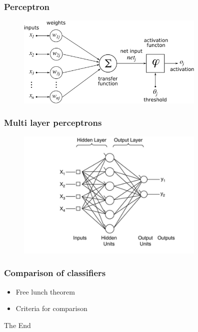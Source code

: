 \documentclass{beamer}
\begin{document}
\begin{frame} %
\frametitle{Perceptron}
\begin{figure}
	\centering
    \includegraphics[width=90mm,scale=1]{./img/perceptron.png}
\end{figure}

\end{frame}
\begin{frame}
\frametitle{Multi layer perceptrons}
\begin{figure}
	\centering
    \includegraphics[width=90mm,scale=1]{./img/MLP.jpg}
\end{figure}
\end{frame}



\begin{frame}
\frametitle{Comparison of classifiers}
\begin{itemize}
	\item Free lunch theorem
	\item Criteria for comparison %
	 
\end{itemize}
\end{frame}





\begin{frame}
\Huge{\centerline{The End}}
\end{frame}

\end{document}
